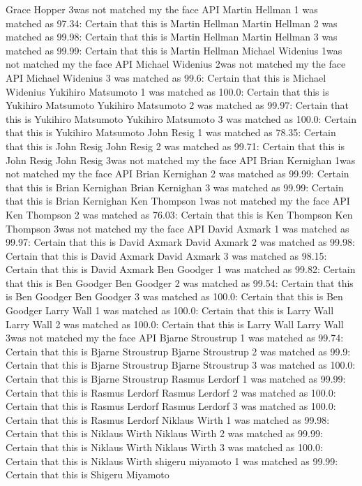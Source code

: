 \documentclass[12pt,a4paper]{article}
\begin{document}
\begin{appendices}
Grace Hopper  3was not matched my the face API
Martin Hellman  1 was matched as 97.34: Certain that this is Martin Hellman
Martin Hellman  2 was matched as 99.98: Certain that this is Martin Hellman
Martin Hellman  3 was matched as 99.99: Certain that this is Martin Hellman
Michael Widenius  1was not matched my the face API
Michael Widenius  2was not matched my the face API
Michael Widenius  3 was matched as 99.6: Certain that this is Michael Widenius
Yukihiro Matsumoto  1 was matched as 100.0: Certain that this is Yukihiro Matsumoto
Yukihiro Matsumoto  2 was matched as 99.97: Certain that this is Yukihiro Matsumoto
Yukihiro Matsumoto  3 was matched as 100.0: Certain that this is Yukihiro Matsumoto
John Resig  1 was matched as 78.35: Certain that this is John Resig
John Resig  2 was matched as 99.71: Certain that this is John Resig
John Resig  3was not matched my the face API
Brian Kernighan  1was not matched my the face API
Brian Kernighan  2 was matched as 99.99: Certain that this is Brian Kernighan
Brian Kernighan  3 was matched as 99.99: Certain that this is Brian Kernighan
Ken Thompson  1was not matched my the face API
Ken Thompson  2 was matched as 76.03: Certain that this is Ken Thompson
Ken Thompson  3was not matched my the face API
David Axmark  1 was matched as 99.97: Certain that this is David Axmark
David Axmark  2 was matched as 99.98: Certain that this is David Axmark
David Axmark  3 was matched as 98.15: Certain that this is David Axmark
Ben Goodger  1 was matched as 99.82: Certain that this is Ben Goodger
Ben Goodger  2 was matched as 99.54: Certain that this is Ben Goodger
Ben Goodger  3 was matched as 100.0: Certain that this is Ben Goodger
Larry Wall  1 was matched as 100.0: Certain that this is Larry Wall
Larry Wall  2 was matched as 100.0: Certain that this is Larry Wall
Larry Wall  3was not matched my the face API
Bjarne Stroustrup  1 was matched as 99.74: Certain that this is Bjarne Stroustrup
Bjarne Stroustrup  2 was matched as 99.9: Certain that this is Bjarne Stroustrup
Bjarne Stroustrup  3 was matched as 100.0: Certain that this is Bjarne Stroustrup
Rasmus Lerdorf  1 was matched as 99.99: Certain that this is Rasmus Lerdorf
Rasmus Lerdorf  2 was matched as 100.0: Certain that this is Rasmus Lerdorf
Rasmus Lerdorf  3 was matched as 100.0: Certain that this is Rasmus Lerdorf
Niklaus Wirth  1 was matched as 99.98: Certain that this is Niklaus Wirth
Niklaus Wirth  2 was matched as 99.99: Certain that this is Niklaus Wirth
Niklaus Wirth  3 was matched as 100.0: Certain that this is Niklaus Wirth
shigeru miyamoto 1 was matched as 99.99: Certain that this is Shigeru Miyamoto

\end{appendices}
\end{document}
